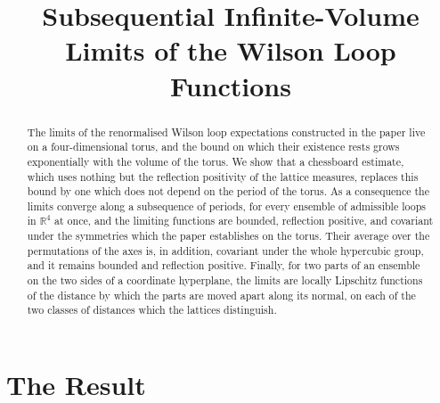 \documentclass[11pt]{preprint}
\title{Subsequential Infinite-Volume Limits of the Wilson Loop Functions}
\author{}
\date{}
\numberwithin{equation}{section}
\theoremstyle{definition}
\theoremstyle{remark}
\theoremstyle{plain}
\begin{document}
\maketitle

\begin{abstract}
The limits of the renormalised Wilson loop expectations constructed in the paper live on a four-dimensional torus, and the bound on which their existence rests grows exponentially with the volume of the torus. We show that a chessboard estimate, which uses nothing but the reflection positivity of the lattice measures, replaces this bound by one which does not depend on the period of the torus. As a consequence the limits converge along a subsequence of periods, for every ensemble of admissible loops in $\mathbb R^4$ at once, and the limiting functions are bounded, reflection positive, and covariant under the symmetries which the paper establishes on the torus. Their average over the permutations of the axes is, in addition, covariant under the whole hypercubic group, and it remains bounded and reflection positive. Finally, for two parts of an ensemble on the two sides of a coordinate hyperplane, the limits are locally Lipschitz functions of the distance by which the parts are moved apart along its normal, on each of the two classes of distances which the lattices distinguish.
\end{abstract}

\section{The Result}\label{sec:result}
\end{document}
